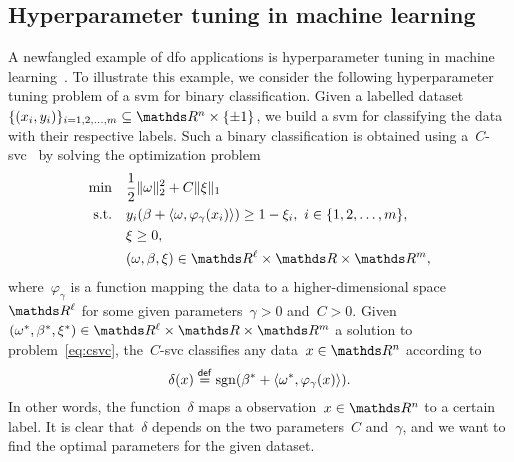 \subsection{Hyperparameter tuning in machine learning}
\label{subsec:machine-learning}

A newfangled example of \gls{dfo} applications is hyperparameter tuning in machine learning~\cite{Ghanbari_Scheinberg_2017}.
To illustrate this example, we consider the following hyperparameter tuning problem of a \gls{svm} for binary classification.
Given a labelled dataset~$\set{(x_i, y_i)}_{i = 1, 2, \dots, m} \subseteq \R^n \times \set{\pm 1}$, we build a \gls{svm} for classifying the data with their respective labels.
Such a binary classification is obtained using a~$C$-\gls{svc}~\cite{Chang_Lin_2011} by solving the optimization problem
\begin{subequations}
    \label{eq:csvc}
    \begin{align}
        \min        & \quad \frac{1}{2} \norm{\omega}_2^2 + C \norm{\xi}_1\\
        \text{s.t.} & \quad y_i (\beta + \inner{\omega, \varphi_{\gamma}(x_i)}) \ge 1 - \xi_i, ~ i \in \set{1, 2, \dots, m},\\
                    & \quad \xi \ge 0,\\
                    & \quad (\omega, \beta, \xi) \in \R^{\ell} \times \R \times \R^m,
    \end{align}
\end{subequations}
where~$\varphi_{\gamma}$ is a function mapping the data to a higher-dimensional space~$\R^{\ell}$ for some given parameters~$\gamma > 0$ and~$C > 0$.
Given~$(\omega^{\ast}, \beta^{\ast}, \xi^{\ast}) \in \R^{\ell} \times \R \times \R^m$ a solution to problem~\cref{eq:csvc}, the~$C$-\gls{svc} classifies any data~$x \in \R^n$ according to
\begin{equation*}
    \delta(x) \mathrel{\stackrel{\mathsf{def}}{=}} \operatorname{sgn}(\beta^{\ast} + \langle\omega^{\ast}, \varphi_{\gamma}(x)\rangle).
\end{equation*}
In other words, the function~$\delta$ maps a observation~$x \in \R^n$ to a certain label.
It is clear that~$\delta$ depends on the two parameters~$C$ and~$\gamma$, and we want to find the optimal parameters for the given dataset.



